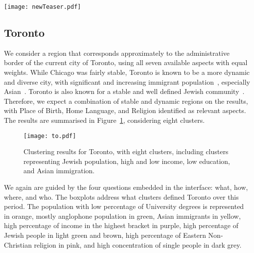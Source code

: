 \begin{figure*}
    \centering
 \texttt{[image: newTeaser.pdf]}
 \caption{Workflow to discover gentrification in Chicago: the purple cluster
 corresponds to high education / income. Its population is increasing over time,
 absorbing from the majority White cluster (orange). By selecting the purple
 cluster in 2010, the region is highlighted in the maps. The proportion of
 people with 4+ years of college is increasing in the whole city (grey IQRs),
 but significantly more in this region (black).\label{fig:chiWorkflow}}
\end{figure*}



\subsection{Toronto}

We consider a region that corresponds approximately to the administrative border
of the current city of Toronto, using all seven available aspects with equal
weights. While Chicago was fairly stable, Toronto is known to be a more dynamic
and diverse city, with significant and increasing immigrant
population~\citep{hulchanski2007three,Fong2011}, especially
Asian~\citep{Fong2003}. Toronto is also known for a stable and well defined
Jewish community~\citep{Harold2018, Fong2011}. Therefore, we expect a
combination of stable and dynamic regions on the results, with Place of Birth,
Home Language, and Religion identified as relevant aspects. The results are
summarised in Figure~\ref{fig:to}, considering eight clusters.

\begin{figure}
    \centering 
    \texttt{[image: to.pdf]}
    \caption{Clustering results for Toronto, with eight clusters, including
    clusters representing Jewish population, high and low income, low education,
    and Asian immigration.\label{fig:to}}
\end{figure}

We again are guided by the four questions embedded in the interface: what, how,
where, and who. The boxplots address what clusters defined Toronto over this
period. The population with low percentage of University degrees is represented
in orange, mostly anglophone population in green, Asian immigrants in yellow,
high percentage of income in the highest bracket in purple, high percentage of
Jewish people in light green and brown, high percentage of Eastern Non-Christian
religion in pink, and high concentration of single people in dark grey. 

